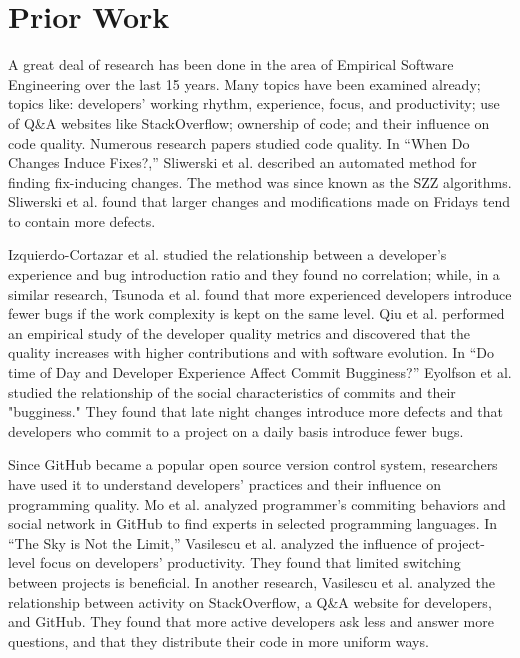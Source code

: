 
\chapter{Prior Work}\label{chapter:prior_work}

A great deal of research has been done in the area of Empirical Software Engineering over the last 15 years. Many topics have been examined already; topics like: developers’ working rhythm, experience, focus, and productivity; use of Q\&A websites like StackOverflow; ownership of code; and their influence on code quality\parencite{Sliwerski,Izquierdo-Cortazar,tsunoda,qiu,Eyolfson,Mo,Vasilescu:2016:SLM}. Numerous research papers studied code quality. In “When Do Changes Induce Fixes?,” Sliwerski et al. described an automated method for finding fix-inducing changes. The method was since known as the SZZ algorithms\parencite{Sliwerski}. Sliwerski et al. found that larger changes and modifications made on Fridays tend to contain more defects. \par

Izquierdo-Cortazar et al. studied the relationship between a developer’s experience and bug introduction ratio and they found no correlation\parencite{Izquierdo-Cortazar}; while, in a similar research, Tsunoda et al. found that more experienced developers introduce fewer bugs if the work complexity is kept on the same level\parencite{tsunoda}. Qiu et al. performed an empirical study of the developer quality metrics and discovered that the quality increases with higher contributions and with software evolution\parencite{qiu}. In “Do time of Day and Developer Experience Affect Commit Bugginess?” Eyolfson et al. studied the relationship of the social characteristics of  commits and their "bugginess." They found that late night changes introduce more defects and that developers who commit to a project on a daily basis introduce fewer bugs\parencite{Eyolfson}. \par

Since GitHub became a popular open source version control system, researchers have used it to understand developers’ practices and their influence on programming quality. Mo et al. analyzed programmer’s commiting behaviors and social network in GitHub to find experts in selected programming languages\parencite{Mo}. In “The Sky is Not the Limit,” Vasilescu et al. analyzed the influence of project-level focus on developers’ productivity. They found that limited switching between projects is beneficial\parencite{Vasilescu:2016:SLM}. In another research, Vasilescu et al. analyzed the relationship between activity on StackOverflow, a Q\&A website for developers, and GitHub. They found that more active developers ask less and answer more questions, and that they distribute their code in more uniform ways\parencite{Vasilescu:2013:SO}. \par

